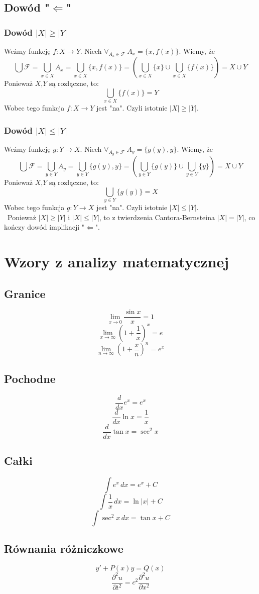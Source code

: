 \documentclass{article}
\begin{document}
\subsection*{Dowód "$\Leftarrow$"}
\subsubsection*{Dowód $|X|\geq |Y|$}
Weźmy funkcję $f: X \rightarrow Y$. Niech $\forall_{A_x \in \mathcal{F}} \ A_x = \{x,f(x)\}$. Wiemy, że \[\bigcup \mathcal{F} = \bigcup_{x \in X} A_x = \bigcup_{x\in X} \{x,f(x)\} =  (\bigcup_{x\in X} \{x\} \cup \bigcup_{x\in X} \{f(x)\}) = X \cup Y\]
Ponieważ $X$,$Y$ są rozłączne, to: \[\bigcup_{x\in X} \{f(x)\} = Y\]
Wobec tego funkcja $f: X \rightarrow Y$ jest "na". Czyli istotnie $|X|\geq |Y|$.

\subsubsection*{Dowód $|X|\leq |Y|$}
Weźmy funkcję $g: Y \rightarrow X$. Niech $\forall_{A_y \in \mathcal{F}} \ A_y = \{g(y),y\}$. Wiemy, że \[\bigcup \mathcal{F} = \bigcup_{y \in Y} A_y = \bigcup_{y\in Y} \{g(y),y\} =  (\bigcup_{y\in Y} \{g(y)\} \cup \bigcup_{y\in Y} \{y\}) = X \cup Y\]
Ponieważ $X$,$Y$ są rozłączne, to: \[\bigcup_{y\in Y} \{g(y)\} = X\]
Wobec tego funkcja $g: Y \rightarrow X$ jest "na". Czyli istotnie $|X|\leq |Y|$. \\\
Ponieważ $|X|\geq |Y|$ i $|X|\leq |Y|$, to z twierdzenia Cantora-Bernsteina $|X| = |Y|$, co kończy dowód implikacji "$\Leftarrow$".

\section*{Wzory z analizy matematycznej}

\subsection*{Granice}

\[
    \lim_{x \to 0} \frac{\sin x}{x} = 1
\]
\[
    \lim_{x \to \infty} \left(1 + \frac{1}{x}\right)^x = e
\]
\[
    \lim_{n \to \infty} \left(1 + \frac{x}{n}\right)^n = e^x
\]

\subsection*{Pochodne}

\[
    \frac{d}{dx} e^x = e^x
\]
\[
    \frac{d}{dx} \ln x = \frac{1}{x}
\]
\[
    \frac{d}{dx} \tan x = \sec^2 x
\]

\subsection*{Całki}

\[
    \int e^x \,dx = e^x + C
\]
\[
    \int \frac{1}{x} \,dx = \ln |x| + C
\]
\[
    \int \sec^2 x \,dx = \tan x + C
\]

\subsection*{Równania różniczkowe}

\[
    y' + P(x)y = Q(x)
\]
\[
    \frac{\partial^2 u}{\partial t^2} = c^2 \frac{\partial^2 u}{\partial x^2}
\]
\end{document}
